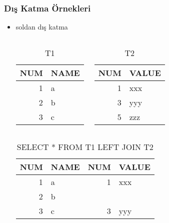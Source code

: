 \documentclass[dvipsnames]{beamer}
\theoremstyle{plain}
\begin{document}
\begin{frame}[fragile]
  \frametitle{Dış Katma Örnekleri}

  \begin{itemize}
    \item soldan dış katma
    \begin{columns}[t]
      \begin{tiny}
      \begin{table}
        \caption{T1}
        \begin{tabular}{|r|l|}\hline
NUM & NAME\\\hline\hline
  1 & a   \\\hline
  2 & b   \\\hline
  3 & c   \\\hline
        \end{tabular}
      \end{table}
      \end{tiny}

      \begin{tiny}
      \begin{table}
        \caption{T2}
        \begin{tabular}{|r|l|}\hline
NUM & VALUE\\\hline\hline
  1 & xxx  \\\hline
  3 & yyy  \\\hline
  5 & zzz  \\\hline
        \end{tabular}
      \end{table}
      \end{tiny}
    \end{columns}

    \pause
    \begin{center}
      \begin{tiny}
      \begin{table}
        \caption{SELECT * FROM T1 LEFT JOIN T2}
        \begin{tabular}{|r|l|r|l|}\hline
NUM & NAME & NUM & VALUE\\\hline\hline
  1 & a    &   1 & xxx  \\\hline
  2 & b    &     &      \\\hline
  3 & c    &   3 & yyy  \\\hline
        \end{tabular}
      \end{table}
      \end{tiny}
    \end{center}
  \end{itemize}
\end{frame}
\end{document}
